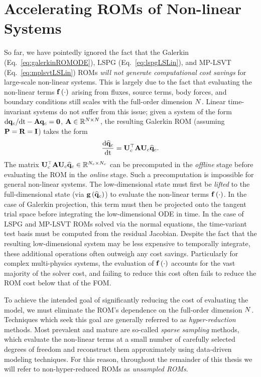 \section{Accelerating ROMs of Non-linear Systems}\label{sec:hyperreduction}

So far, we have pointedly ignored the fact that the Galerkin (Eq.~\ref{eq:galerkinROMODE}), LSPG (Eq.~\ref{eq:lspgLSLin}), and MP-LSVT (Eq.~\ref{eq:mplsvtLSLin}) ROMs \textit{will not generate computational cost savings} for large-scale non-linear systems. This is largely due to the fact that evaluating the non-linear terms $\mathbf{f} \left(\cdot\right)$ arising from fluxes, source terms, body forces, and boundary conditions still scales with the full-order dimension $N$. Linear time-invariant systems do not suffer from this issue; given a system of the form $\text{d}\mathbf{q}_{c}/\text{d}\text{t} - \mathbf{A} \mathbf{q}_{c} = \mathbf{0}$, $\mathbf{A} \in \mathbb{R}^{N \times N}$, the resulting Galerkin ROM (assuming $\consScale = \resScale = \identMat$) takes the form
%
\begin{equation}
    \ode{\consVecCoef}{\timeVar} = \consTrial^\top \dummyMat \consTrial \consVecCoef.
\end{equation}
%
The matrix $\consTrial^\top \dummyMat \consTrial \consVecCoef \inRTwo{\numConsModes}{\numConsModes}$ can be precomputed in the \textit{offline} stage before evaluating the ROM in the \textit{online} stage. Such a precomputation is impossible for general non-linear systems. The low-dimensional state must first be \textit{lifted} to the full-dimensional state (via $\mathbf{g} \left(\mathbf{\widehat{q}}_{c}\right)$) to evaluate the non-linear terms $\mathbf{f} \left(\cdot\right)$. In the case of Galerkin projection, this term must then be projected onto the tangent trial space before integrating the low-dimensional ODE in time. In the case of LSPG and MP-LSVT ROMs solved via the normal equations, the time-variant test basis must be computed from the residual Jacobian. Despite the fact that the resulting low-dimensional system may be less expensive to temporally integrate, these additional operations often outweigh any cost savings. Particularly for complex multi-physics systems, the evaluation of $\mathbf{f} \left(\cdot\right)$ accounts for the vast majority of the solver cost, and failing to reduce this cost often fails to reduce the ROM cost below that of the FOM.

To achieve the intended goal of significantly reducing the cost of evaluating the model, we must eliminate the ROM's dependence on the full-order dimension $N$. Techniques which seek this goal are generally referred to as \textit{hyper-reduction} methods. Most prevalent and mature are so-called \textit{sparse sampling} methods, which evaluate the non-linear terms at a small number of carefully selected degrees of freedom and reconstruct them approximately using data-driven modeling techniques. For this reason, throughout the remainder of this thesis we will refer to non-hyper-reduced ROMs as \textit{unsampled ROMs}.

